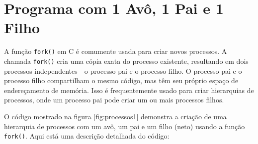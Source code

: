 \documentclass[
	12pt,				%
	openright,			%
	oneside,			%
	a4paper,			%
	chapter=TITLE,		%
	english,			%
	french,				%
	spanish,			%
	brazil				%
	]{abntex2}
\theoremstyle{definition}
\begin{document}

\section{Programa com 1 Avô, 1 Pai e 1 Filho}


A função \texttt{fork()} em C é comumente usada para criar novos processos. 
A chamada \texttt{fork()} cria uma cópia exata do processo existente, 
resultando em dois processos independentes - o processo pai e o processo filho. 
O processo pai e o processo filho compartilham o mesmo código, mas têm 
seu próprio espaço de endereçamento de memória. Isso é frequentemente usado 
para criar hierarquias de processos, onde um processo pai pode criar um ou 
mais processos filhos.

O código mostrado na figura \ref{fig:processos1} demonstra a criação de uma hierarquia de processos 
com um avô, um pai e um filho (neto) usando a função \texttt{fork()}. 
Aqui está uma descrição detalhada do código:
\end{document}
